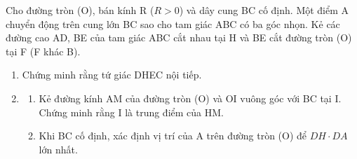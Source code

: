 \begin{ex}
Cho đường tròn (O), bán kính R ($R>0$) và dây cung BC cố định. Một điểm A chuyển động trên cung lớn BC sao cho tam giác ABC có ba góc nhọn. Kẻ các đường cao AD, BE của tam giác ABC cắt nhau tại H và BE cắt đường tròn (O) tại F (F khác B).
	\begin{enumerate}
		\item[1)] Chứng minh rằng tứ giác DHEC nội tiếp.
		\item[2)] 
		\begin{enumerate}
			\item[a)] Kẻ đường kính AM của đường tròn (O) và OI vuông góc với BC tại I. Chứng minh rằng I là trung điểm của HM.
			\item[b)] Khi BC cố định, xác định vị trí của A trên đường tròn (O) để $DH \cdot DA$ lớn nhất.
		\end{enumerate}
	\end{enumerate}
\end{ex}
